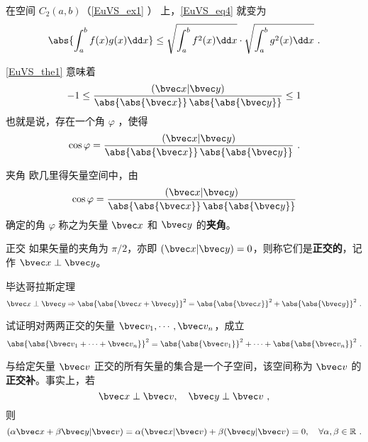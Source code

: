 \begin{example}{}
在空间 $C_2(a,b)$（\autoref{EuVS_ex1} ） 上，\autoref{EuVS_eq4} 就变为
\begin{equation}
\abs{\int_a^b f(x)g(x)\dd x}\leq\sqrt{\int_a^b f^2(x)\dd x}\cdot\sqrt{\int_a^b g^2(x)\dd x}~.
\end{equation}
\end{example}
\autoref{EuVS_the1} 意味着
\begin{equation}
-1\leq\frac{(\bvec x|\bvec y)}{\abs{\abs{\bvec x}}\,\abs{\abs{\bvec y}}}\leq1
\end{equation}
也就是说，存在一个角 $\varphi$ ，使得
\begin{equation}
\cos\varphi=\frac{(\bvec x|\bvec y)}{\abs{\abs{\bvec x}}\,\abs{\abs{\bvec y}}}~.
\end{equation}
\begin{definition}{夹角}\label{EuVS_def3}
欧几里得矢量空间中，由
\begin{equation}
\cos\varphi=\frac{(\bvec x|\bvec y)}{\abs{\abs{\bvec x}}\,\abs{\abs{\bvec y}}}
\end{equation}
确定的角 $\varphi$ 称之为矢量 $\bvec x$ 和 $\bvec y$ 的\textbf{夹角}。 
\end{definition}
\begin{definition}{正交}
如果矢量的夹角为 $\pi/2$，亦即 $(\bvec x|\bvec y)=0$，则称它们是\textbf{正交的}，记作 $\bvec x\perp\bvec y$。
\end{definition}
\begin{theorem}{毕达哥拉斯定理}
\begin{equation}
\bvec x\perp\bvec y\Rightarrow\abs{\abs{\bvec x+\bvec y}}^2=\abs{\abs{\bvec x}}^2+\abs{\abs{\bvec y}}^2~.
\end{equation}
\end{theorem}
\begin{exercise}{}
试证明对两两正交的矢量 $\bvec v_1,\cdots,\bvec v_n$，成立
\begin{equation}\label{EuVS_eq5}
\abs{\abs{\bvec v_1+\cdots+\bvec v_n}}^2=\abs{\abs{\bvec v_1}}^2+\cdots+\abs{\abs{\bvec v_n}}^2~.
\end{equation}
\end{exercise}
\begin{example}{}
与给定矢量 $\bvec v$ 正交的所有矢量的集合是一个子空间，该空间称为 $\bvec v$ 的\textbf{正交补}。事实上，若
\begin{equation}
\bvec x\perp\bvec v,\quad\bvec y\perp\bvec v~,
\end{equation}
则
\begin{equation}
(\alpha\bvec x+\beta\bvec y|\bvec v)=\alpha(\bvec x|\bvec v)+\beta(\bvec y|\bvec v)=0,\quad \forall\alpha,\beta\in\mathbb R~.
\end{equation}
\end{example}
